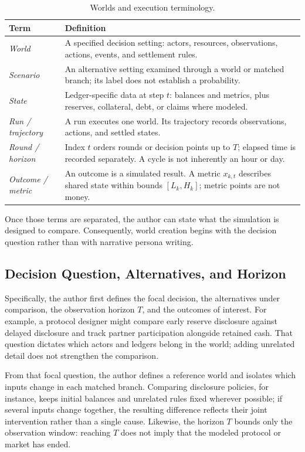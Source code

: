\begin{table}[H]
\caption{Worlds and execution terminology.}
\label{tab:definitions}
\centering\small
\renewcommand{\arraystretch}{1.12}
\begin{tabularx}{\columnwidth}{@{}>{\raggedright\arraybackslash}p{}Y@{}}
\toprule
Term & Definition \\
\midrule
\textit{World} & A specified decision setting: actors, resources, observations, actions, events, and settlement rules. \\
\textit{Scenario} & An alternative setting examined through a world or matched branch; its label does not establish a probability. \\
\textit{State} & Ledger-specific data at step $t$: balances and metrics, plus reserves, collateral, debt, or claims where modeled. \\
\textit{Run / trajectory} & A run executes one world. Its trajectory records observations, actions, and settled states. \\
\textit{Round / horizon} & Index $t$ orders rounds or decision points up to $T$; elapsed time is recorded separately. A cycle is not inherently an hour or day. \\
\textit{Outcome / metric} & An outcome is a simulated result. A metric $x_{k,t}$ describes shared state within bounds $[L_k,H_k]$; metric points are not money. \\
\bottomrule
\end{tabularx}
\end{table}

Once those terms are separated, the author can state what the simulation
is designed to compare. Consequently, world creation begins with the decision
question rather than with narrative persona writing.

\subsection{Decision Question, Alternatives, and Horizon}
Specifically, the author first defines the focal decision, the alternatives
under comparison, the observation horizon $T$, and the outcomes of interest.
For example, a protocol designer might compare early reserve disclosure against
delayed disclosure and track partner participation alongside retained cash.
That question dictates which actors and ledgers belong in the world; adding
unrelated detail does not strengthen the comparison.

From that focal question, the author defines a reference world and
isolates which inputs change in each matched branch. Comparing disclosure
policies, for instance, keeps initial balances and unrelated rules fixed
wherever possible; if several inputs change together, the resulting difference
reflects their joint intervention rather than a single cause. Likewise,
the horizon $T$ bounds only the observation window: reaching $T$ does not imply
that the modeled protocol or market has ended.


